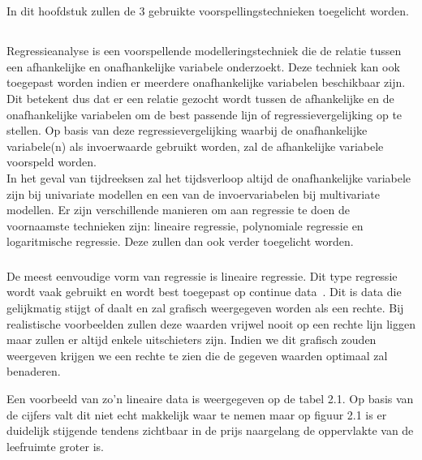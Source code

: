 \chapter{}
\label{ch:stand-van-zaken}

In dit hoofdstuk zullen de 3 gebruikte voorspellingstechnieken toegelicht worden.

\section{}
\label{subsec: Theoretische toelichting over polynomiale regressie}

Regressieanalyse is een voorspellende modelleringstechniek die de relatie tussen een afhankelijke en onafhankelijke variabele onderzoekt. Deze techniek kan ook toegepast worden indien er meerdere onafhankelijke variabelen beschikbaar zijn.
Dit betekent dus dat er een relatie gezocht wordt tussen de afhankelijke en de onafhankelijke variabelen om de best passende lijn of regressievergelijking op te stellen. Op basis van deze regressievergelijking waarbij de onafhankelijke variabele(n) als invoerwaarde gebruikt worden, zal de afhankelijke variabele voorspeld worden.
\\ In het geval van tijdreeksen zal het tijdsverloop altijd de onafhankelijke variabele zijn bij univariate modellen en een van de invoervariabelen bij multivariate modellen. 
Er zijn verschillende manieren om aan regressie te doen de voornaamste technieken zijn: lineaire regressie, polynomiale regressie en logaritmische regressie. Deze zullen dan ook verder toegelicht worden.

\subsection{}
De meest eenvoudige vorm van regressie is lineaire regressie. Dit type regressie wordt vaak gebruikt en wordt best toegepast op continue data~\autocite{Pant2019}. Dit is data die gelijkmatig stijgt of daalt en zal grafisch weergegeven worden als een rechte. Bij realistische voorbeelden zullen deze waarden vrijwel nooit op een rechte lijn liggen maar zullen er altijd enkele uitschieters zijn. Indien we dit grafisch zouden weergeven krijgen we een rechte te zien die de gegeven waarden optimaal zal benaderen.

Een voorbeeld van zo'n lineaire data is weergegeven op de tabel 2.1. Op basis van de cijfers valt dit niet echt makkelijk waar te nemen maar op figuur 2.1 is er duidelijk stijgende tendens zichtbaar in de prijs naargelang de oppervlakte van de leefruimte groter is.

